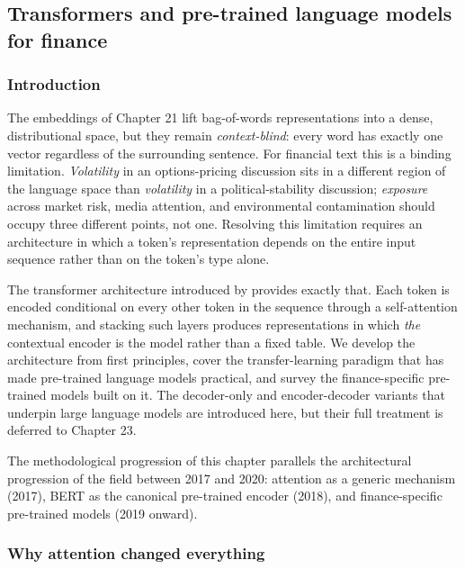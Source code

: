 \subsection{Transformers and pre-trained language models for finance}

% 
%

\subsubsection{Introduction}

The embeddings of Chapter 21 lift bag-of-words representations into a dense, distributional space, but they remain \textit{context-blind}: every word has exactly one vector regardless of the surrounding sentence. For financial text this is a binding limitation. \textit{Volatility} in an options-pricing discussion sits in a different region of the language space than \textit{volatility} in a political-stability discussion; \textit{exposure} across market risk, media attention, and environmental contamination should occupy three different points, not one. Resolving this limitation requires an architecture in which a token's representation depends on the entire input sequence rather than on the token's type alone.

The transformer architecture introduced by \cite{vaswani2017attention} provides exactly that. Each token is encoded conditional on every other token in the sequence through a self-attention mechanism, and stacking such layers produces representations in which \textit{the} contextual encoder is the model rather than a fixed table. We develop the architecture from first principles, cover the transfer-learning paradigm that has made pre-trained language models practical, and survey the finance-specific pre-trained models built on it. The decoder-only and encoder-decoder variants that underpin large language models are introduced here, but their full treatment is deferred to Chapter 23.

The methodological progression of this chapter parallels the architectural progression of the field between 2017 and 2020: attention as a generic mechanism (2017), BERT as the canonical pre-trained encoder (2018), and finance-specific pre-trained models (2019 onward).

\subsubsection{Why attention changed everything}

